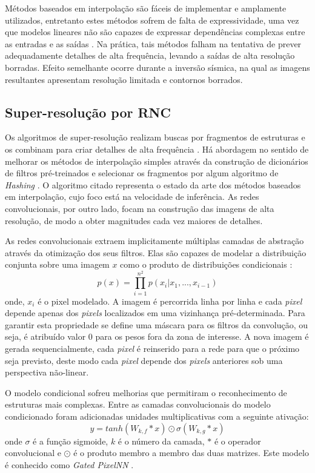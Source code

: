 Métodos baseados em interpolação são fáceis de implementar e amplamente utilizados,
entretanto estes métodos sofrem de falta de expressividade, uma vez que modelos lineares
não são capazes de expressar dependências complexas entre as entradas e as saídas \citep{HsiehAndrews1978}.
Na prática, tais métodos falham na tentativa de prever adequadamente detalhes de alta frequência,
levando a saídas de alta resolução borradas. Efeito semelhante ocorre durante a inversão sísmica,
na qual as imagens resultantes apresentam resolução limitada e contornos borrados.

\subsection{Super-resolução por RNC}

Os algoritmos de super-resolução realizam buscas por
fragmentos de estruturas e os combinam para criar detalhes
de alta frequência \citep{Freeman2002,Huang2015}. Há abordagem no sentido
de melhorar os métodos de interpolação simples através da construção
de dicionários de filtros pré-treinados e selecionar os fragmentos
por algum algoritmo de \textit{Hashing} \citep{Romano2017}. O algoritmo citado
representa o estado da arte dos métodos baseados em interpolação, cujo foco está na
velocidade de inferência. As redes convolucionais, por outro lado,
focam na construção das imagens de alta resolução, de modo a obter magnitudes
cada vez maiores de detalhes.

As redes convolucionais extraem implicitamente
múltiplas camadas de abstração através da otimização dos seus filtros.
Elas são capazes de modelar a distribuição conjunta sobre
uma imagem $x$ como o produto de distribuições condicionais \citep{Oord16}:
\begin{equation}
\label{eqn:prodcnn}
p(x) = \prod_{i=1}^{n^2}p(x_i|x_1,...,x_{i-1})
\end{equation}
onde, $x_i$ é o pixel modelado. A imagem é percorrida linha por linha e cada
\textit{pixel} depende apenas dos \textit{pixels} localizados em uma vizinhança pré-determinada.
Para garantir esta propriedade se define uma máscara para os filtros da convolução,
ou seja, é atribuído valor $0$ para os pesos fora da zona de interesse.
A nova imagem é gerada sequencialmente, cada \textit{pixel} é reinserido para a rede para que o próximo seja previsto,
deste modo cada \textit{pixel} depende dos \textit{pixels} anteriores
sob uma perspectiva não-linear.

O modelo condicional sofreu melhorias que permitiram o reconhecimento de estruturas mais complexas.
Entre as camadas convolucionais do modelo condicionado foram adicionadas unidades
multiplicativas com a seguinte ativação:
\begin{equation}
\label{eqn:actvcnn}
y = tanh(W_{k,f} * x)\odot \sigma(W_{k,g}*x)
\end{equation}
onde $\sigma$ é a função sigmoide, $k$ é o número da camada, $*$ é o operador
convolucional e $\odot$ é o produto membro a membro das duas matrizes. Este modelo é
conhecido como \textit{Gated PixelNN} \citep{Oord16}.

